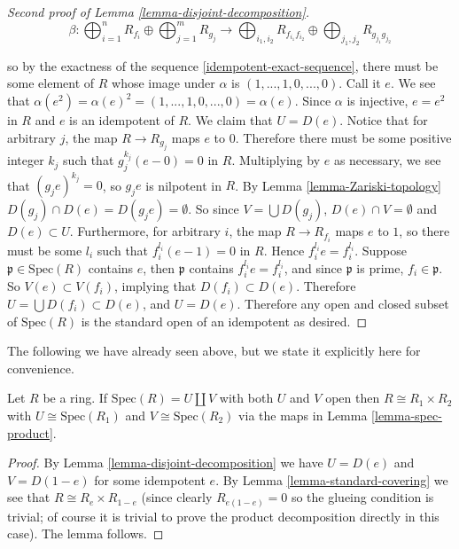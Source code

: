 \begin{proof}[Second proof of Lemma \ref{lemma-disjoint-decomposition}]
\[
\beta: \bigoplus\nolimits_{i=1}^ {n} R_{f_{i}} \oplus \bigoplus\nolimits_{j=1}^{m} R_{g_j} 
\rightarrow \bigoplus\nolimits_{i_1,i_2} R_{f_{i_1}f_{i_2}} \oplus \bigoplus\nolimits_{j_1,j_2} 
R_{g_{j_1}g_{j_2}}
\] 

\noindent
so by the exactness of the sequence 
\eqref{idempotent-exact-sequence}, there must be some element of $R$ whose 
image under $\alpha$ is $(1,...,1,0,...,0)$. Call it $e$. We see that 
$\alpha(e^2) = \alpha(e)^2 = (1,...,1,0,...,0) = \alpha(e)$. Since $\alpha$ is 
injective, $e = e^2$ in $R$ and $e$ is an idempotent of $R$. We claim that
$U = D(e)$.
Notice that for arbitrary $j$, the map $R \rightarrow R_{g_j}$ maps $e$ 
to $0$. Therefore there must be some positive integer $k_j$ such that 
$g_j^{k_j}(e-0) = 0$ in $R$. Multiplying by $e$ as necessary,
we see that $(g_j e)^{k_j} = 0$,
so $g_j e$ is nilpotent in $R$. By
Lemma \ref{lemma-Zariski-topology}
$D(g_j) \cap D(e) = D(g_j e) = \emptyset$. So since
$V = \bigcup D(g_j)$, $D(e) \cap V = \emptyset$ and
$D(e) \subset U$. Furthermore, for arbitrary $i$, the 
map $R \rightarrow R_{f_i}$ maps $e$ to $1$, so there must be some $l_i$ such 
that $f_i^{l_i}(e-1) =0$ in $R$. Hence $f_i^{l_i}e = f_i^{l_i}$. Suppose 
$\mathfrak{p} \in \text{Spec}(R)$ contains $e$,
then $\mathfrak{p}$ contains  
$f_i^{l_i}e = f_i^{l_i}$, and since $\mathfrak{p}$ is prime, $f_i \in 
\mathfrak{p}$. So $V(e) \subset V(f_i)$, implying that $D(f_i) \subset D(e)$. 
Therefore $U = \bigcup D(f_i) \subset D(e)$, and $U = D(e)$.
Therefore any open 
and closed subset of $\text{Spec}(R)$ is the standard open
of an idempotent as 
desired. 
\end{proof}

\noindent
The following we have already seen above, but we state it explicitly here
for convenience.

\begin{lemma}
\label{lemma-disjoint-implies-product}
Let $R$ be a ring.
If $\text{Spec}(R) = U \amalg V$ with both $U$ and $V$ open
then $R \cong R_1 \times R_2$ with $U \cong \text{Spec}(R_1)$
and $V \cong \text{Spec}(R_2)$ via the maps in Lemma \ref{lemma-spec-product}.
\end{lemma}

\begin{proof}
By Lemma \ref{lemma-disjoint-decomposition} we have
$U = D(e)$ and $V = D(1-e)$ for some idempotent $e$.
By Lemma \ref{lemma-standard-covering} we see that
$R \cong R_e \times R_{1 - e}$ (since clearly $R_{e(1-e)} = 0$
so the glueing condition is trivial; of course it is
trivial to prove the product decomposition directly in this
case). The lemma follows.
\end{proof}


